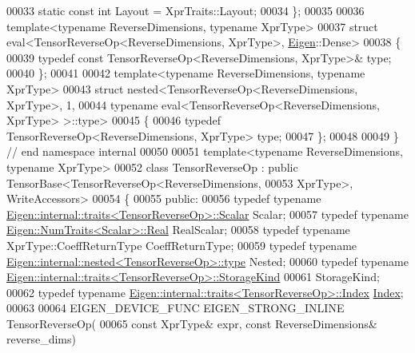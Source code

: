 \begin{DoxyCode}
00033   \textcolor{keyword}{static} \textcolor{keyword}{const} \textcolor{keywordtype}{int} Layout = XprTraits::Layout;
00034 \};
00035 
00036 \textcolor{keyword}{template}<\textcolor{keyword}{typename} ReverseDimensions, \textcolor{keyword}{typename} XprType>
00037 \textcolor{keyword}{struct }eval<TensorReverseOp<ReverseDimensions, XprType>, \hyperlink{namespace_eigen}{Eigen}::Dense>
00038 \{
00039   \textcolor{keyword}{typedef} \textcolor{keyword}{const} TensorReverseOp<ReverseDimensions, XprType>& type;
00040 \};
00041 
00042 \textcolor{keyword}{template}<\textcolor{keyword}{typename} ReverseDimensions, \textcolor{keyword}{typename} XprType>
00043 \textcolor{keyword}{struct }nested<TensorReverseOp<ReverseDimensions, XprType>, 1,
00044             typename eval<TensorReverseOp<ReverseDimensions, XprType> >::type>
00045 \{
00046   \textcolor{keyword}{typedef} TensorReverseOp<ReverseDimensions, XprType> type;
00047 \};
00048 
00049 \}  \textcolor{comment}{// end namespace internal}
00050 
00051 \textcolor{keyword}{template}<\textcolor{keyword}{typename} ReverseDimensions, \textcolor{keyword}{typename} XprType>
00052 \textcolor{keyword}{class }TensorReverseOp : \textcolor{keyword}{public} TensorBase<TensorReverseOp<ReverseDimensions,
00053                                           XprType>, WriteAccessors>
00054 \{
00055   \textcolor{keyword}{public}:
00056   \textcolor{keyword}{typedef} \textcolor{keyword}{typename} \hyperlink{struct_eigen_1_1internal_1_1traits}{Eigen::internal::traits<TensorReverseOp>::Scalar}
       Scalar;
00057   \textcolor{keyword}{typedef} \textcolor{keyword}{typename} \hyperlink{group___sparse_core___module}{Eigen::NumTraits<Scalar>::Real} RealScalar;
00058   \textcolor{keyword}{typedef} \textcolor{keyword}{typename} XprType::CoeffReturnType CoeffReturnType;
00059   \textcolor{keyword}{typedef} \textcolor{keyword}{typename} \hyperlink{class_eigen_1_1internal_1_1_tensor_lazy_evaluator_writable}{Eigen::internal::nested<TensorReverseOp>::type}
       Nested;
00060   \textcolor{keyword}{typedef} \textcolor{keyword}{typename} \hyperlink{struct_eigen_1_1internal_1_1traits}{Eigen::internal::traits<TensorReverseOp>::StorageKind}
00061                                                                     StorageKind;
00062   \textcolor{keyword}{typedef} \textcolor{keyword}{typename} \hyperlink{struct_eigen_1_1internal_1_1traits}{Eigen::internal::traits<TensorReverseOp>::Index}
       \hyperlink{namespace_eigen_a62e77e0933482dafde8fe197d9a2cfde}{Index};
00063 
00064   EIGEN\_DEVICE\_FUNC EIGEN\_STRONG\_INLINE TensorReverseOp(
00065       \textcolor{keyword}{const} XprType& expr, \textcolor{keyword}{const} ReverseDimensions& reverse\_dims)

\end{DoxyCode}
